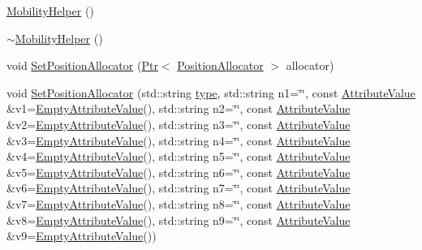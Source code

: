 \begin{DoxyCompactItemize}
\item 
\hyperlink{classns3_1_1MobilityHelper_aab9d28083eec358a8dd88a01c841a6a8}{Mobility\+Helper} ()
\item 
\hyperlink{classns3_1_1MobilityHelper_a8b68e3762ca9a1b03a5c2bff759a6d2e}{$\sim$\+Mobility\+Helper} ()
\item 
void \hyperlink{classns3_1_1MobilityHelper_ac59d5295076be3cc11021566713a28c5}{Set\+Position\+Allocator} (\hyperlink{classns3_1_1Ptr}{Ptr}$<$ \hyperlink{classns3_1_1PositionAllocator}{Position\+Allocator} $>$ allocator)
\item 
void \hyperlink{classns3_1_1MobilityHelper_a8301233f4c276cdf9a6ff6baca182bd2}{Set\+Position\+Allocator} (std\+::string \hyperlink{visualizer-ideas_8txt_add98db9e15e2a58cf2b57623e7aa893a}{type}, std\+::string n1=\char`\"{}\char`\"{}, const \hyperlink{classns3_1_1AttributeValue}{Attribute\+Value} \&v1=\hyperlink{classns3_1_1EmptyAttributeValue}{Empty\+Attribute\+Value}(), std\+::string n2=\char`\"{}\char`\"{}, const \hyperlink{classns3_1_1AttributeValue}{Attribute\+Value} \&v2=\hyperlink{classns3_1_1EmptyAttributeValue}{Empty\+Attribute\+Value}(), std\+::string n3=\char`\"{}\char`\"{}, const \hyperlink{classns3_1_1AttributeValue}{Attribute\+Value} \&v3=\hyperlink{classns3_1_1EmptyAttributeValue}{Empty\+Attribute\+Value}(), std\+::string n4=\char`\"{}\char`\"{}, const \hyperlink{classns3_1_1AttributeValue}{Attribute\+Value} \&v4=\hyperlink{classns3_1_1EmptyAttributeValue}{Empty\+Attribute\+Value}(), std\+::string n5=\char`\"{}\char`\"{}, const \hyperlink{classns3_1_1AttributeValue}{Attribute\+Value} \&v5=\hyperlink{classns3_1_1EmptyAttributeValue}{Empty\+Attribute\+Value}(), std\+::string n6=\char`\"{}\char`\"{}, const \hyperlink{classns3_1_1AttributeValue}{Attribute\+Value} \&v6=\hyperlink{classns3_1_1EmptyAttributeValue}{Empty\+Attribute\+Value}(), std\+::string n7=\char`\"{}\char`\"{}, const \hyperlink{classns3_1_1AttributeValue}{Attribute\+Value} \&v7=\hyperlink{classns3_1_1EmptyAttributeValue}{Empty\+Attribute\+Value}(), std\+::string n8=\char`\"{}\char`\"{}, const \hyperlink{classns3_1_1AttributeValue}{Attribute\+Value} \&v8=\hyperlink{classns3_1_1EmptyAttributeValue}{Empty\+Attribute\+Value}(), std\+::string n9=\char`\"{}\char`\"{}, const \hyperlink{classns3_1_1AttributeValue}{Attribute\+Value} \&v9=\hyperlink{classns3_1_1EmptyAttributeValue}{Empty\+Attribute\+Value}())
\item 

\end{DoxyCompactItemize}
